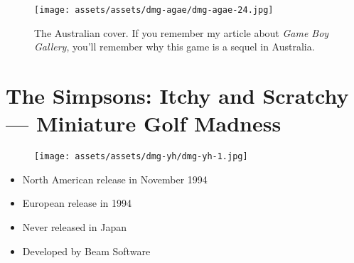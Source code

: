 \documentclass{book}
\begin{document}
\begin{figure}[hbt]
\vskip 10pt
\centering \texttt{[image: assets/assets/dmg-agae/dmg-agae-24.jpg]}\par\pagetwodescription The Australian cover. If you remember my article about \emph{Game Boy Gallery}, you’ll remember why this game is a sequel in Australia.
\vskip 6pt
\end{figure}



\begingroup \chapter*{The Simpsons: Itchy and Scratchy — Miniature Golf Madness} \endgroup
\begin{figure}[H]
\vskip 4pt
\centering
\texttt{[image: assets/assets/dmg-yh/dmg-yh-1.jpg]}\end{figure}
\begin{itemize} [nosep]




\item North American release in November 1994







\item European release in 1994








\item Never released in Japan





\item Developed by Beam Software

\end{itemize}\noindent
\end{document}
